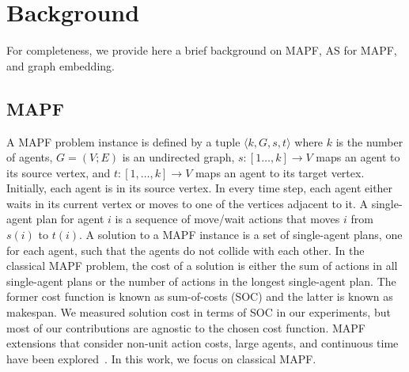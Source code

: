 \documentclass[letterpaper]{article} %
\newcommand{\tuple}[1]{\ensuremath{\langle #1\rangle}}
\newcommand{\Roni}[1]{}
\begin{document}





\section{Background}
\label{scn:Background}


For completeness, we provide here a brief background on MAPF, AS for MAPF, and graph embedding. 

\subsection{MAPF}
A MAPF problem instance is defined by a tuple $\tuple{k,G,s,t}$ 
where 
$k$ is the number of agents, 
$G = (V;E)$ is an undirected graph, 
$s: [1\ldots, k]\rightarrow V$ maps an agent to its source vertex, 
and $t: [1,\ldots, k]\rightarrow V$ maps an agent to its target vertex. 
Initially, each agent is in its source vertex.
In every time step, each agent either waits
in its current vertex or moves to one of the vertices adjacent to it. 
A single-agent plan for agent $i$ is a sequence of move/wait actions that moves $i$ from $s(i)$ to $t(i)$. 
A solution to a MAPF instance is a set of single-agent plans, one for each agent, such that the agents do not collide with each other. 
In the classical MAPF problem, the cost of a solution is either the sum of actions in all single-agent plans
or the number of actions in the longest single-agent plan. The former cost function is known as sum-of-costs (SOC) and the latter is known as makespan. 
We measured solution cost in terms of SOC in our experiments, but most of our contributions are agnostic to the chosen cost function.   
MAPF extensions that consider non-unit action costs, large agents, and continuous time have been explored~\cite{atzmon2020generalizing,andreychuk2022multi,li2019multi}. In this work, we focus on classical MAPF.  
\end{document}
